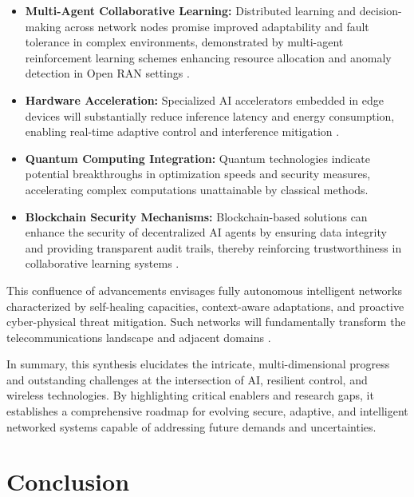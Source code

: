 \begin{itemize}
    \item \textbf{Multi-Agent Collaborative Learning:} Distributed learning and decision-making across network nodes promise improved adaptability and fault tolerance in complex environments, demonstrated by multi-agent reinforcement learning schemes enhancing resource allocation and anomaly detection in Open RAN settings \cite{ref49}.
    \item \textbf{Hardware Acceleration:} Specialized AI accelerators embedded in edge devices will substantially reduce inference latency and energy consumption, enabling real-time adaptive control and interference mitigation \cite{ref50}.
    \item \textbf{Quantum Computing Integration:} Quantum technologies indicate potential breakthroughs in optimization speeds and security measures, accelerating complex computations unattainable by classical methods.
    \item \textbf{Blockchain Security Mechanisms:} Blockchain-based solutions can enhance the security of decentralized AI agents by ensuring data integrity and providing transparent audit trails, thereby reinforcing trustworthiness in collaborative learning systems \cite{ref54}.
\end{itemize}

This confluence of advancements envisages fully autonomous intelligent networks characterized by self-healing capacities, context-aware adaptations, and proactive cyber-physical threat mitigation. Such networks will fundamentally transform the telecommunications landscape and adjacent domains \cite{ref55}.

\bigskip

In summary, this synthesis elucidates the intricate, multi-dimensional progress and outstanding challenges at the intersection of AI, resilient control, and wireless technologies. By highlighting critical enablers and research gaps, it establishes a comprehensive roadmap for evolving secure, adaptive, and intelligent networked systems capable of addressing future demands and uncertainties.

\section{Conclusion}

